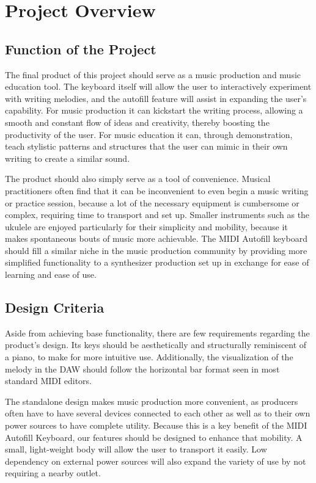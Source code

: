 \section{Project Overview}
\subsection{Function of the Project}

The final product of this project should serve as a music production and music
education tool. The keyboard itself will allow the user to interactively experiment with
writing melodies, and the autofill feature will assist in expanding the user’s capability.
For music production it can kickstart the writing process, allowing a smooth and
constant flow of ideas and creativity, thereby boosting the productivity of the user.
For music education it can, through demonstration, teach stylistic patterns and
structures that the user can mimic in their own writing to create a similar sound.

The product should also simply serve as a tool of convenience. Musical practitioners often find
that it can be inconvenient to even begin a music writing or practice session, because a lot of the
necessary equipment is cumbersome or complex, requiring time to transport and set up. Smaller
instruments such as the ukulele are enjoyed particularly for their simplicity and mobility, because
it makes spontaneous bouts of music more achievable. The MIDI Autofill keyboard should fill a
similar niche in the music production community by providing more simplified functionality to a
synthesizer production set up in exchange for ease of learning and ease of use.

\subsection{Design Criteria}

Aside from achieving base functionality, there are few requirements regarding the
product’s design. Its keys should be aesthetically and structurally reminiscent of a
piano, to make for more intuitive use. Additionally, the visualization of the melody in
the DAW should follow the horizontal bar format seen in most standard MIDI editors.

The standalone design makes music production more convenient, as producers often have to have
several devices connected to each other as well as to their own power sources to have complete
utility. Because this is a key benefit of the MIDI Autofill Keyboard, our features should be
designed to enhance that mobility. A small, light-weight body will allow the user to transport it
easily. Low dependency on external power sources will also expand the variety of use by not
requiring a nearby outlet.

